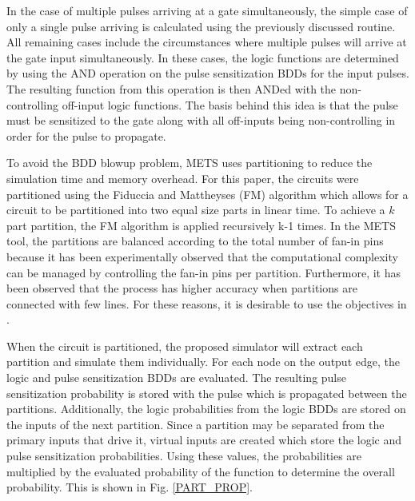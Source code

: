 \documentclass[conference]{IEEEtran}
\newcommand{\squeezeup}{\vspace{-2mm}}
\begin{document}
In the case of multiple pulses arriving at a gate simultaneously, the simple case of only a single pulse arriving is calculated using the previously discussed routine. All remaining cases include the circumstances where multiple pulses will arrive at the gate input simultaneously. In these cases, the logic functions are determined by using the AND operation on the pulse sensitization BDDs for the input pulses. The resulting function from this operation is then ANDed with the non-controlling off-input logic functions. The basis behind this idea is that the pulse must be sensitized to the gate along with all off-inputs being non-controlling in order for the pulse to propagate.

To avoid the BDD blowup problem, METS uses partitioning to reduce the simulation time and memory overhead. For this paper, the circuits were partitioned using the Fiduccia and Mattheyses (FM) algorithm \cite{Fiduccia1982} which allows for a circuit to be partitioned into two equal size parts in linear time. To achieve a $k$ part partition, the FM algorithm is applied recursively k-1 times. In the METS tool, the partitions are balanced according to the total number of fan-in pins because it has been experimentally observed that the computational complexity can be managed by controlling the fan-in pins per partition. Furthermore, it has been observed that the process has higher accuracy when partitions are connected with few lines. For these reasons, it is desirable to use the objectives in \cite{Fiduccia1982}.

When the circuit is partitioned, the proposed simulator will extract each partition and simulate them individually. For each node on the output edge, the logic and pulse sensitization BDDs are evaluated. The resulting pulse sensitization probability is stored with the pulse which is propagated between the partitions. Additionally, the logic probabilities from the logic BDDs are stored on the inputs of the next partition. Since a partition may be separated from the primary inputs that drive it, virtual inputs are created which store the logic and pulse sensitization probabilities. Using these values, the probabilities are multiplied by the evaluated probability of the function to determine the overall probability. This is shown in Fig. \ref{PART_PROP}.

\squeezeup
\setlength{\abovecaptionskip}{-12pt}

\setlength{\belowcaptionskip}{-12pt}
\end{document}

